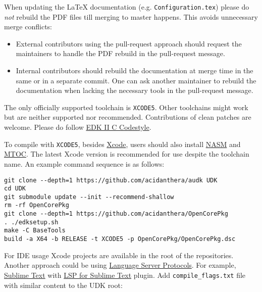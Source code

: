 \documentclass[]{article}
\providecommand{\tightlist}{%
  \setlength{\itemsep}{0pt}\setlength{\parskip}{0pt}}
\begin{document}
When updating the LaTeX documentation (e.g. \texttt{Configuration.tex}) please
do \textit{not} rebuild the PDF files till merging to master happens. This avoids
unnecessary merge conflicts:
\begin{itemize}
\tightlist
\item External contributors using the pull-request approach should request
  the maintainers to handle the PDF rebuild in the pull-request message.
\item Internal contributors should rebuild the documentation at merge time
  in the same or in a separate commit. One can ask another maintainer to
  rebuild the documentation when lacking the necessary tools
  in the pull-request message.
\end{itemize}

The only officially supported toolchain is \texttt{XCODE5}. Other toolchains
might work but are neither supported nor recommended. Contributions of clean
patches are welcome. Please do follow
\href{https://github.com/tianocore/tianocore.github.io/wiki/Code-Style-C}{EDK II C Codestyle}.

To compile with \texttt{XCODE5}, besides \href{https://developer.apple.com/xcode}{Xcode},
users should also install \href{https://www.nasm.us}{NASM} and
\href{https://github.com/acidanthera/ocbuild/tree/master/external}{MTOC}.
The latest Xcode version is recommended for use despite the toolchain name.
An example command sequence is as follows:

\begin{lstlisting}[caption=Compilation Commands, label=compile, style=ocbash]
git clone --depth=1 https://github.com/acidanthera/audk UDK
cd UDK
git submodule update --init --recommend-shallow
rm -rf OpenCorePkg
git clone --depth=1 https://github.com/acidanthera/OpenCorePkg
. ./edksetup.sh
make -C BaseTools
build -a X64 -b RELEASE -t XCODE5 -p OpenCorePkg/OpenCorePkg.dsc
\end{lstlisting}

For IDE usage Xcode projects are available in the root of the repositories. Another
approach could be using \href{https://microsoft.github.io/language-server-protocol}{Language Server Protocols}. For example, \href{https://www.sublimetext.com}{Sublime Text} with
\href{https://lsp.sublimetext.io}{LSP for Sublime Text} plugin.
Add \texttt{compile\_flags.txt} file with similar content to the UDK root:
\end{document}
